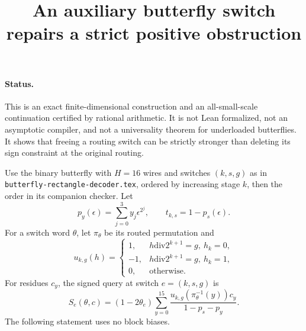 \documentclass[11pt]{article}
\begin{document}
\title{An auxiliary butterfly switch repairs a strict positive obstruction}
\author{}\date{}\maketitle
\paragraph{Status.}
This is an exact finite-dimensional construction and an all-small-scale
continuation certified by rational arithmetic. It is not Lean formalized,
not an asymptotic compiler, and not a universality theorem for underloaded
butterflies. It shows that freeing a routing switch can be strictly
stronger than deleting its sign constraint at the original routing.

Use the binary butterfly with $H=16$ wires and switches $(k,s,g)$ as in
\texttt{butterfly-rectangle-decoder.tex}, ordered by increasing stage $k$,
then the order in its companion checker. Let
\[
 p_y(\epsilon)=\sum_{j=0}^3 y_j\epsilon^{2^j},\qquad
 t_{k,s}=1-p_s(\epsilon).
\]
For a switch word $\theta$, let $\pi_\theta$ be its routed permutation and
\[
 u_{k,g}(h)=\begin{cases}
  1,&h\mathbin{\mathrm{div}}2^{k+1}=g,\ h_k=0,\\
 -1,&h\mathbin{\mathrm{div}}2^{k+1}=g,\ h_k=1,\\
 0,&\text{otherwise}.
 \end{cases}
\]
For residues $c_y$, the signed query at switch $e=(k,s,g)$ is
\[
 S_e(\theta,c)=
 (1-2\theta_e)\sum_{y=0}^{15}
 \frac{u_{k,g}(\pi_\theta^{-1}(y))c_y}{1-p_s-p_y}.
\]
The following statement uses no block biases.
\end{document}
